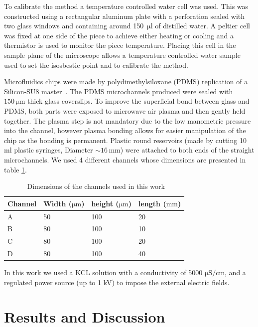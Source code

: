 \documentclass[twocolumn]{svjour3}       %
\begin{document}
To calibrate the method a temperature controlled water cell was used. This was constructed using a rectangular aluminum plate with a perforation sealed with two glass windows and containing around 150~$\mathrm{\mu l}$ of distilled water. A peltier cell was fixed at one side of the piece to achieve either heating or cooling and a thermistor is used to monitor the piece temperature.  Placing this cell in the sample plane of the microscope allows a temperature controlled water sample used to set the isosbestic point and to calibrate the method. 

Microfluidics chips were made by polydimethylsiloxane (PDMS) replication of a Silicon-SU8 master~\cite{duffy1998rapid}. The PDMS microchannels produced were sealed with $150\,\mathrm{\mu m}$ thick glass coverslips. To improve the superficial bond between glass and PDMS, both parts were exposed to microwave air plasma and then gently held together. The plasma step is not mandatory due to the low manometric pressure into the channel, however plasma bonding allows for easier manipulation of the chip as the bonding is permanent. Plastic round reservoirs (made by cutting 10 ml plastic syringes, Diameter $\sim 16\,\mathrm{mm}$) were attached to both ends of the straight microchannels. We used 4 different channels whose dimensions are presented in table \ref{channeldims}.
\begin{table}[ht]
\small
  \caption{\ Dimensions of the channels used in this work}
  \begin{tabular*}{0.5\textwidth}{@{\extracolsep{\fill}}llll}
    \hline
    Channel & Width ($\mathrm{\mu m}$) & height ($\mathrm{\mu m}$) & length ($\mathrm{mm}$) \\
    \hline
    A & 50 & 100 & 20\\
    B & 80 & 100 & 10\\
    C & 80 & 100 & 20\\
    D & 80 & 100 & 40\\
    \hline
  \end{tabular*}
  \label{channeldims}
\end{table} 
 
In this work we used a KCL solution with a conductivity of 5000 $\mathrm{\mu S/cm}$, and a regulated power source (up to 1 kV) to impose the external electric fields.



\section{Results and Discussion}
\end{document}
